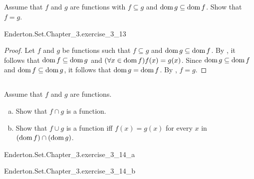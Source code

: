 \documentclass{report}
\begin{document}
\subsection{}%

  Assume that $f$ and $g$ are functions with $f \subseteq g$ and
    $\mathop{\text{dom}}{g} \subseteq \mathop{\text{dom}}{f}$.
  Show that $f = g$.

    {Enderton.Set.Chapter\_3.exercise\_3\_13}

  \begin{proof}
    Let $f$ and $g$ be functions such that $f \subseteq g$ and
      $\mathop{\text{dom}}{g} \subseteq \mathop{\text{dom}}{f}$.
    By , it follows that $\mathop{\text{dom}}{f} \subseteq \mathop{\text{dom}}{g}$
      and $(\forall x \in \mathop{\text{dom}}{f}) f(x) = g(x)$.
    Since $\mathop{\text{dom}}{g} \subseteq \mathop{\text{dom}}{f}$ and $\mathop{\text{dom}}{f} \subseteq \mathop{\text{dom}}{g}$, it
      follows that $\mathop{\text{dom}}{g} = \mathop{\text{dom}}{f}$.
    By , $f = g$.
  \end{proof}

\subsection{}%

  Assume that $f$ and $g$ are functions.
  \begin{enumerate}[(a)]
    \item Show that $f \cap g$ is a function.
    \item Show that $f \cup g$ is a function iff $f(x) = g(x)$ for every $x$ in
      $(\mathop{\text{dom}}{f}) \cap (\mathop{\text{dom}}{g})$.
  \end{enumerate}

    {Enderton.Set.Chapter\_3.exercise\_3\_14\_a}

    {Enderton.Set.Chapter\_3.exercise\_3\_14\_b}
\end{document}
